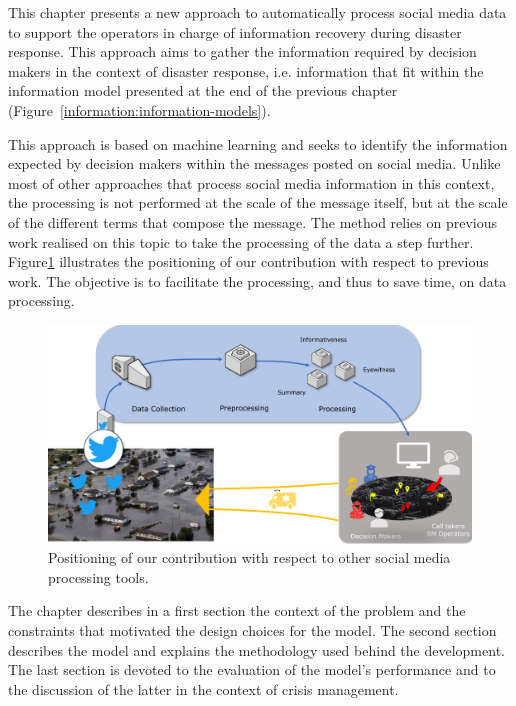 This chapter presents a new approach to automatically process social media data to support
the operators in charge of information recovery during disaster response.
This approach aims to gather the information required by decision makers in the context
of disaster response, i.e. information that fit within the information model presented
at the end of the previous chapter (Figure~\ref{information:information-models}).

This approach is based on machine learning and seeks to identify the information expected
by decision makers within the messages posted on social media.
Unlike most of other approaches that process social media information in this context,
the processing is not performed at the scale of the message itself, but at the scale of
the different terms that compose the message.
The method relies on previous work realised on this topic to take the processing of the
data a step further.
Figure\ref{processing:social-media-processing} illustrates the positioning of our
contribution with respect to previous work.
The objective is to facilitate the processing, and thus to save time, on data processing.

\begin{figure}[htb]
    \centering
    \includegraphics[width=\textwidth]{figures/chap-4/social-media-processing.pdf}
    \caption{Positioning of our contribution with respect to other social media processing tools.}
    \label{processing:social-media-processing}
\end{figure}

The chapter describes in a first section the context of the problem and the constraints
that motivated the design choices for the model.
The second section describes the model and explains the methodology used behind the development.
The last section is devoted to the evaluation of the model's performance and to the
discussion of the latter in the context of crisis management.

